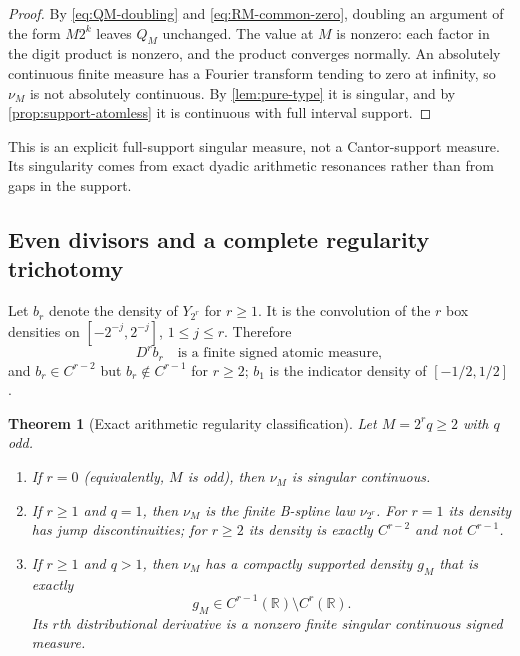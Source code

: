 \documentclass[11pt,oneside]{article}
\newtheorem{theorem}{Theorem}[section]
\theoremstyle{definition}
\theoremstyle{remark}
\newcommand{\R}{\mathbb R}
\numberwithin{equation}{section}
\newcommand{\1}{\mathbf 1}
\begin{document}
\begin{proof}
By \eqref{eq:QM-doubling} and \eqref{eq:RM-common-zero}, doubling an argument of the
form $M2^k$ leaves $Q_M$ unchanged.  The value at $M$ is nonzero: each factor in the
digit product is nonzero, and the product converges normally.  An absolutely continuous
finite measure has a Fourier transform tending to zero at infinity, so $\nu_M$ is not
absolutely continuous.  By \cref{lem:pure-type} it is singular, and by
\cref{prop:support-atomless} it is continuous with full interval support.
\end{proof}

This is an explicit full-support singular measure, not a Cantor-support measure.  Its
singularity comes from exact dyadic arithmetic resonances rather than from gaps in the
support.

\subsection{Even divisors and a complete regularity trichotomy}

Let $b_r$ denote the density of $Y_{2^r}$ for $r\ge1$.  It is the convolution of the
$r$ box densities on $[-2^{-j},2^{-j}]$, $1\le j\le r$.  Therefore
\begin{equation}
 D^r b_r
 \quad\text{is a finite signed atomic measure},
 \label{eq:spline-r-derivative}
\end{equation}
and $b_r\in C^{r-2}$ but $b_r\notin C^{r-1}$ for $r\ge2$; $b_1$ is the indicator density
of $[-1/2,1/2]$.

\begin{theorem}[Exact arithmetic regularity classification]
\label{thm:regularity}
Let $M=2^rq\ge2$ with $q$ odd.
\begin{enumerate}
\item If $r=0$ (equivalently, $M$ is odd), then $\nu_M$ is singular continuous.
\item If $r\ge1$ and $q=1$, then $\nu_M$ is the finite B-spline law $\nu_{2^r}$.
For $r=1$ its density has jump discontinuities; for $r\ge2$ its density is exactly
$C^{r-2}$ and not $C^{r-1}$.
\item If $r\ge1$ and $q>1$, then $\nu_M$ has a compactly supported density $g_M$ that is
exactly
\begin{equation}
 g_M\in C^{r-1}(\R)\setminus C^r(\R).
 \label{eq:exact-regularity}
\end{equation}
Its $r$th distributional derivative is a nonzero finite singular continuous signed measure.
\end{enumerate}
\end{theorem}
\end{document}
